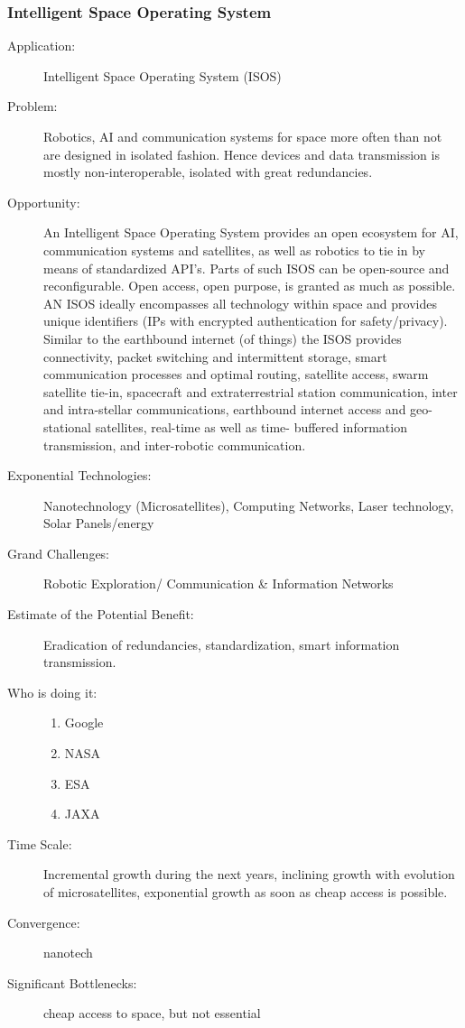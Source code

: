 \subsubsection{Intelligent Space Operating System}
\label{idea:isos}
\begin{description}
\item[Application:] Intelligent Space Operating System (ISOS)

\item[Problem:] Robotics, AI and communication systems for space more often than not are designed
in isolated fashion. Hence devices and data transmission is mostly non-interoperable, isolated
with great redundancies.

\item[Opportunity:] An Intelligent Space Operating System provides an open ecosystem for AI,
communication systems and satellites, as well as robotics to tie in by means of standardized
API’s. Parts of such ISOS can be open-source and reconfigurable. Open access, open purpose, is
granted as much as possible. AN ISOS ideally encompasses all technology within space and
provides unique identifiers (IPs with encrypted authentication for safety/privacy). Similar to the
earthbound internet (of things) the ISOS provides connectivity, packet switching and
intermittent storage, smart communication processes and optimal routing, satellite access, swarm
satellite tie-in, spacecraft and extraterrestrial station communication, inter and intra-stellar
communications, earthbound internet access and geo-stational satellites, real-time as well as time-
buffered information transmission, and inter-robotic communication.

\item[Exponential Technologies:]    Nanotechnology (Microsatellites), Computing Networks, Laser
technology, Solar Panels/energy

\item[Grand Challenges:] Robotic Exploration/ Communication \& Information Networks

\item[Estimate of the Potential Benefit:]  Eradication of redundancies, standardization, smart
information transmission.

\item[Who is doing it:]
\hfill\begin{enumerate}
\item Google
\item NASA
\item ESA
\item JAXA
\end{enumerate}

\item[Time Scale:] Incremental growth during the next years, inclining growth with evolution of microsatellites, exponential growth as soon as cheap access is possible.

\item[Convergence:] nanotech

\item[Significant Bottlenecks:] cheap access to space, but not essential
\end{description}
 
